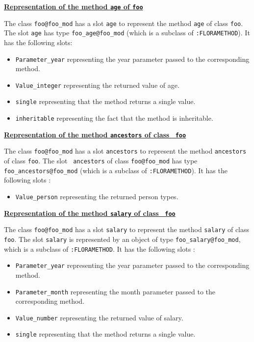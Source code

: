 \underline{{\bf Representation of the method {\tt age}  of {\tt foo}}}

The \Protege class {\tt foo@foo\_mod} has a slot {\tt age} to represent
the \fl method {\tt age} of class {\tt foo}.  The slot {\tt age} has type
{\tt foo\_age@foo\_mod} (which is a subclass of {\tt :FLORAMETHOD}). It
has the following slots:
\begin{itemize}
\item {\tt Parameter\_year} representing the year parameter passed
to the corresponding \fl method.
\item {\tt Value\_integer}
representing the returned value of age.
\item {\tt single} representing that the \fl method returns a single value.
\item {\tt inheritable} representing the fact that the
\fl method is inheritable.
\end{itemize}


\underline{{\bf Representation of the method {\tt ancestors}  of class {\tt
      foo}}}


The \Protege class {\tt foo@foo\_mod} has a slot {\tt ancestors} to
represent the \fl method {\tt ancestors} of class {\tt foo}. The slot {\tt
  ancestors} of class {\tt foo@foo\_mod} has type {\tt
  foo\_ancestors@foo\_mod} (which is a subclass of {\tt :FLORAMETHOD}). It has the
following slots :
\begin{itemize}
\item {\tt Value\_person}
representing the returned person types.
\end{itemize}

\underline{{\bf Representation of the method {\tt salary}  of class {\tt
      foo}}}

 The \Protege class {\tt foo@foo\_mod} has a slot {\tt salary} to represent
the \fl method {\tt salary} of class {\tt foo}. The slot {\tt salary}  is
represented by an object of type
{\tt foo\_salary@foo\_mod}, which is a subclass of {\tt :FLORAMETHOD}. It
has the following slots :
\begin{itemize}
\item {\tt Parameter\_year} representing the year parameter passed
to the corresponding \fl method.
\item {\tt Parameter\_month} representing the month parameter passed
to the corresponding \fl method.
\item {\tt Value\_number}
representing the returned value of salary.
\item {\tt single} representing that the \fl method returns a single value.
\end{itemize}


